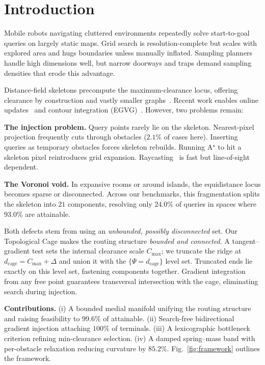 \documentclass[conference]{IEEEtran}
\begin{document}
\section{Introduction}

Mobile robots navigating cluttered environments repeatedly solve start-to-goal queries on largely static maps. Grid search is resolution-complete but scales with explored area and hugs boundaries unless manually inflated. Sampling planners handle high dimensions well, but narrow doorways and traps demand sampling densities that erode this advantage.

Distance-field skeletons precompute the maximum-clearance locus, offering clearance by construction and vastly smaller graphs~\cite{lau2013,oleynikova2018,qi2022pruned}. Recent work enables online updates~\cite{lau2013} and contour integration (EGVG)~\cite{qi2025egvg}. However, two problems remain:

\textbf{The injection problem.} Query points rarely lie on the skeleton. Nearest-pixel projection frequently cuts through obstacles ($2.1\%$ of cases here). Inserting queries as temporary obstacles forces skeleton rebuilds. Running A$^\star$ to hit a skeleton pixel reintroduces grid expansion. Raycasting~\cite{qi2025egvg} is fast but line-of-sight dependent.

\textbf{The Voronoi void.} In expansive rooms or around islands, the equidistance locus becomes sparse or disconnected. Across our benchmarks, this fragmentation splits the skeleton into $21$ components, resolving only $24.0\%$ of queries in spaces where $93.0\%$ are attainable.

Both defects stem from using an \emph{unbounded, possibly disconnected} set. Our Topological Cage makes the routing structure \emph{bounded and connected}. A tangent--gradient test sets the internal clearance scale $C_{\max}$; we truncate the ridge at $d_{\mathrm{cage}}=C_{\max}+\Delta$ and union it with the $\{\Psi=d_{\mathrm{cage}}\}$ level set. Truncated ends lie exactly on this level set, fastening components together. Gradient integration from any free point guarantees transversal intersection with the cage, eliminating search during injection. 

\textbf{Contributions.} (i) A bounded medial manifold unifying the routing structure and raising feasibility to $99.6\%$ of attainable. (ii) Search-free bidirectional gradient injection attaching $100\%$ of terminals. (iii) A lexicographic bottleneck criterion refining min-clearance selection. (iv) A damped spring--mass band with per-obstacle relaxation reducing curvature by $85.2\%$. Fig.~\ref{fig:framework} outlines the framework.
\end{document}
